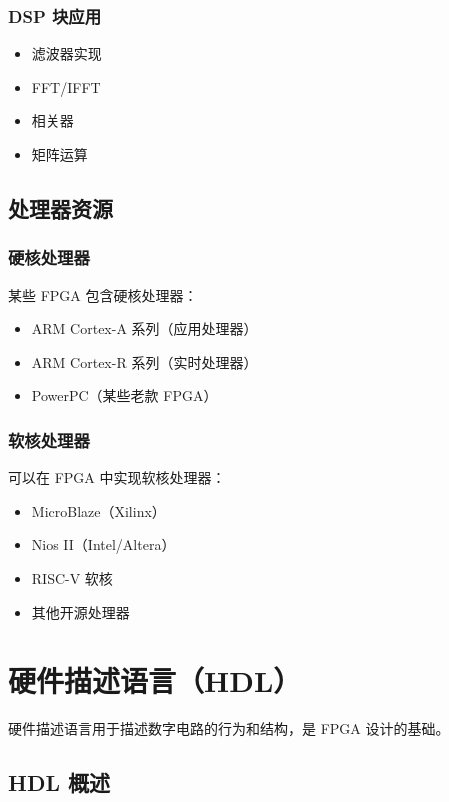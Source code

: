 \subsubsection{DSP 块应用}

\begin{itemize}
  \item 滤波器实现
  \item FFT/IFFT
  \item 相关器
  \item 矩阵运算
\end{itemize}

\subsection{处理器资源}

\subsubsection{硬核处理器}

某些 FPGA 包含硬核处理器：
\begin{itemize}
  \item ARM Cortex-A 系列（应用处理器）
  \item ARM Cortex-R 系列（实时处理器）
  \item PowerPC（某些老款 FPGA）
\end{itemize}

\subsubsection{软核处理器}

可以在 FPGA 中实现软核处理器：
\begin{itemize}
  \item MicroBlaze（Xilinx）
  \item Nios II（Intel/Altera）
  \item RISC-V 软核
  \item 其他开源处理器
\end{itemize}

\section{硬件描述语言（HDL）}

硬件描述语言用于描述数字电路的行为和结构，是 FPGA 设计的基础。

\subsection{HDL 概述}

